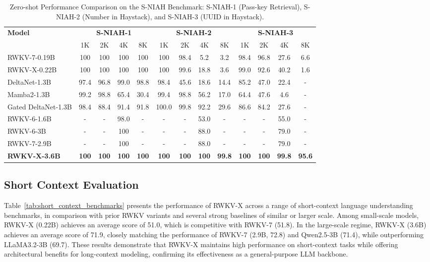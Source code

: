 \begin{table}[h]
\centering
\caption{Zero-shot Performance Comparison on the S-NIAH Benchmark: S-NIAH-1 (Pass-key Retrieval), S-NIAH-2 (Number in Haystack), and S-NIAH-3 (UUID in Haystack).}
\label{tab:S-NIAH}
\resizebox{\textwidth}{!}
{
\begin{tabular}{l|cccc|cccc|cccc}
\toprule
\textbf{Model} & \multicolumn{4}{c|}{\textbf{S-NIAH-1}} & \multicolumn{4}{c|}{\textbf{S-NIAH-2}} & \multicolumn{4}{c}{\textbf{S-NIAH-3}} \\
& 1K & 2K & 4K & 8K & 1K & 2K & 4K & 8K & 1K & 2K & 4K & 8K \\
\midrule
RWKV-7-0.19B & 100 & 100 & 100 & 100 & 100 & 98.4 & 5.2 & 3.2 & 98.4 & 96.8 & 27.6 & 6.6 \\
RWKV-X-0.22B & 100 & 100 & 100 & 100 & 100 & 99.6 & 18.8 & 3.6 & 99.0 & 92.6 & 40.2 & 1.6 \\
\midrule
DeltaNet-1.3B & 97.4 & 96.8 & 99.0 & 98.8 & 98.4 & 45.6 & 18.6 & 14.4 & 85.2 & 47.0 & 22.4 & - \\
Mamba2-1.3B & 99.2 & 98.8 & 65.4 & 30.4 & 99.4 & 98.8 & 56.2 & 17.0 & 64.4 & 47.6 & 4.6 & - \\
Gated DeltaNet-1.3B & 98.4 & 88.4 & 91.4 & 91.8 & 100.0 & 99.8 & 92.2 & 29.6 & 86.6 & 84.2 & 27.6 & - \\
RWKV-6-1.6B & - & - & 98.0 & - & - & - & 53.0 & - & - & - & 55.0 & - \\
\midrule
RWKV-6-3B & - & - & 100 & - & - & - & 88.0 & - & - & - & 79.0 & - \\
RWKV-7-2.9B & - & - & 100 & - & - & - & 88.0 & - & - & - & 79.0 & - \\
\textbf{RWKV-X-3.6B} & \textbf{100} & \textbf{100} & \textbf{100} & \textbf{100} & \textbf{100} & \textbf{100} & \textbf{100} & \textbf{99.8} & \textbf{100} & \textbf{100} & \textbf{99.8} & \textbf{95.6} \\
\bottomrule
\end{tabular}
}
\end{table}

\subsection{Short Context Evaluation}

Table~\ref{tab:short_context_benchmarks} presents the performance of RWKV-X across a range of short-context language understanding benchmarks, in comparison with prior RWKV variants and several strong baselines of similar or larger scale.
Among small-scale models, RWKV-X (0.22B) achieves an average score of 51.0, which is competitive with RWKV-7 (51.8).
In the large-scale regime, RWKV-X (3.6B) achieves an average score of 71.9, closely matching the performance of RWKV-7 (2.9B, 72.8) and Qwen2.5-3B (71.4), while outperforming LLaMA3.2-3B (69.7). 
These results demonstrate that RWKV-X maintains high performance on short-context tasks while offering architectural benefits for long-context modeling, confirming its effectiveness as a general-purpose LLM backbone.

